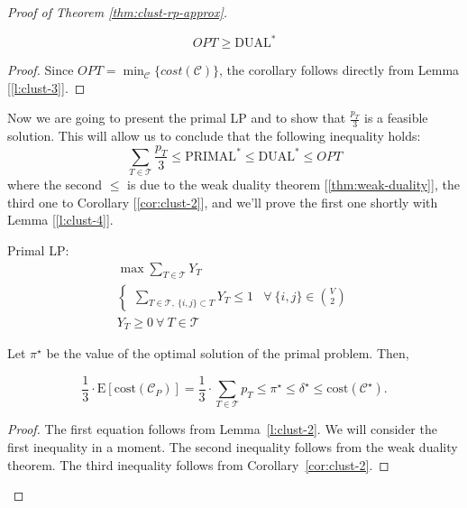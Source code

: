 \begin{proof}[Proof of Theorem \ref{thm:clust-rp-approx}]
    \begin{cor}\label{cor:clust-2}
        \begin{equation}
            OPT \geq \text{DUAL}^*
        \end{equation}
    \end{cor}
    \begin{proof}
        Since $OPT = \min_{\mathscr{C}} \{cost(\mathscr{C})\}$, the corollary follows directly from Lemma [\ref{l:clust-3}].
    \end{proof}

    Now we are going to present the primal LP and to show that $\frac{p_T}{3}$ is a feasible solution. This will allow us to conclude that the following inequality holds:
    \begin{equation}\label{eq:clust-ineq}
        \sum_{T \in \mathscr{T}} \frac{p_T}{3} \leq \text{PRIMAL}^* \leq \text{DUAL}^* \leq OPT
    \end{equation}
    where the second $\leq$ is due to the weak duality theorem [\ref{thm:weak-duality}], the third one to Corollary [\ref{cor:clust-2}], and we'll prove the first one shortly with Lemma [\ref{l:clust-4}].
    
    Primal LP:
    \begin{equation}\label{lp:clust-primal}
        \begin{aligned}
            &\max \sum_{T \in \mathscr{T}} Y_T&\\
            &\begin{cases}
                \sum_{T \in \mathscr{T},\ \{i,j\} \subset T} Y_T \leq 1 & \forall\ \{i,j\} \in \binom{V}{2}
            \end{cases}&\\
            &Y_T \geq 0 \ \forall\ T \in \mathscr{T}&
        \end{aligned}
    \end{equation}
    


Let $\pi^{\star}$ be the value of the optimal solution of the primal problem. Then,
%
\begin{thm}\label{thm:corr-alg-complex}
    $$\frac13 \cdot \text{E}[\text{cost}(\mathcal{C}_P)] = \frac13 \cdot \sum_{T \in \mathcal{T}} p_T \le \pi^\star \le \delta^{\star} \le \text{cost}(\mathcal{C}^{\star}).$$
\end{thm}
%
\begin{proof}
    The first equation follows from Lemma~\ref{l:clust-2}. We will consider the first inequality in a moment. The second inequality follows from the weak duality theorem. The third inequality follows from Corollary~\ref{cor:clust-2}.


\end{proof}
\end{proof}

